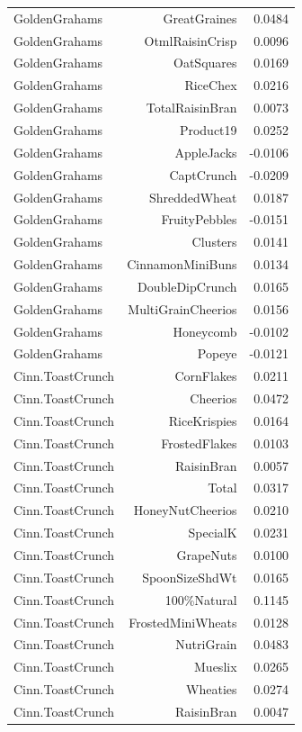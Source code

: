 \begin{longtable}{@{}lrr@{}}
GoldenGrahams & GreatGraines & 0.0484 \\
GoldenGrahams & OtmlRaisinCrisp & 0.0096 \\
GoldenGrahams & OatSquares & 0.0169 \\
GoldenGrahams & RiceChex & 0.0216 \\
GoldenGrahams & TotalRaisinBran & 0.0073 \\
GoldenGrahams & Product19 & 0.0252 \\
GoldenGrahams & AppleJacks & -0.0106 \\
GoldenGrahams & CaptCrunch & -0.0209 \\
GoldenGrahams & ShreddedWheat & 0.0187 \\
GoldenGrahams & FruityPebbles & -0.0151 \\
GoldenGrahams & Clusters & 0.0141 \\
GoldenGrahams & CinnamonMiniBuns & 0.0134 \\
GoldenGrahams & DoubleDipCrunch & 0.0165 \\
GoldenGrahams & MultiGrainCheerios & 0.0156 \\
GoldenGrahams & Honeycomb & -0.0102 \\
GoldenGrahams & Popeye & -0.0121 \\
Cinn.ToastCrunch & CornFlakes & 0.0211 \\
Cinn.ToastCrunch & Cheerios & 0.0472 \\
Cinn.ToastCrunch & RiceKrispies & 0.0164 \\
Cinn.ToastCrunch & FrostedFlakes & 0.0103 \\
Cinn.ToastCrunch & RaisinBran & 0.0057 \\
Cinn.ToastCrunch & Total & 0.0317 \\
Cinn.ToastCrunch & HoneyNutCheerios & 0.0210 \\
Cinn.ToastCrunch & SpecialK & 0.0231 \\
Cinn.ToastCrunch & GrapeNuts & 0.0100 \\
Cinn.ToastCrunch & SpoonSizeShdWt & 0.0165 \\
Cinn.ToastCrunch & 100\%Natural & 0.1145 \\
Cinn.ToastCrunch & FrostedMiniWheats & 0.0128 \\
Cinn.ToastCrunch & NutriGrain & 0.0483 \\
Cinn.ToastCrunch & Mueslix & 0.0265 \\
Cinn.ToastCrunch & Wheaties & 0.0274 \\
Cinn.ToastCrunch & RaisinBran & 0.0047 \\

\end{longtable}

